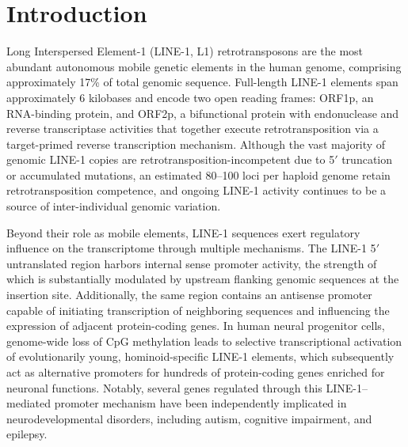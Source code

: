 \documentclass[11pt, a4paper]{article}
\begin{document}
\newpage

\tableofcontents
\newpage

\section*{Introduction}

Long Interspersed Element-1 (LINE-1, L1) retrotransposons are
the most abundant autonomous mobile genetic elements in the
human genome, comprising approximately 17\% of total genomic
sequence\cite{ardeljan2017, beck2010}.
Full-length LINE-1 elements span approximately 6 kilobases and encode two open
reading frames: ORF1p, an RNA-binding protein, and ORF2p, a
bifunctional protein with endonuclease and reverse transcriptase
activities that together execute retrotransposition via a
target-primed reverse transcription mechanism\cite{ardeljan2017}.
Although the vast majority of genomic LINE-1 copies are
retrotransposition-incompetent due to 5$'$ truncation or
accumulated mutations, an estimated 80--100 loci per haploid
genome retain retrotransposition competence, and ongoing LINE-1
activity continues to be a source of inter-individual genomic
variation\cite{beck2010}.

Beyond their role as mobile elements, LINE-1 sequences exert
regulatory influence on the transcriptome through multiple
mechanisms. The LINE-1 5$'$ untranslated region harbors
internal sense promoter activity, the strength of which is
substantially modulated by upstream flanking genomic sequences
at the insertion site\cite{lavie2004}. Additionally, the same
region contains an antisense promoter capable of initiating
transcription of neighboring sequences and influencing the
expression of adjacent protein-coding genes\cite{honda2020}.
In human neural progenitor cells, genome-wide loss of CpG
methylation leads to selective transcriptional activation of
evolutionarily young, hominoid-specific LINE-1 elements, which
subsequently act as alternative promoters for hundreds of
protein-coding genes enriched for neuronal functions\cite{jonsson2019}.
Notably, several genes regulated through this LINE-1--mediated
promoter mechanism have been independently implicated in
neurodevelopmental disorders, including autism, cognitive
impairment, and epilepsy\cite{jonsson2019}.
\end{document}
